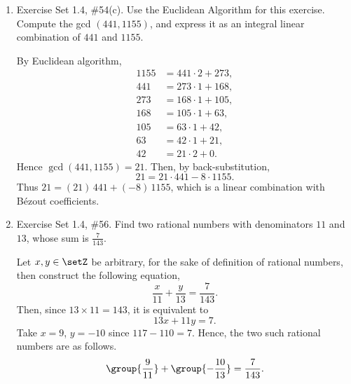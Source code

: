 \begin{enumerate}
  \item Exercise Set 1.4, \#54(c). Use the Euclidean Algorithm for this exercise. Compute the 
  gcd $(441,1155)$, and express it as an integral linear combination of $441$ and $1155$.
  \begin{subanswer}
    By Euclidean algorithm,
    \[
      \begin{aligned}
        1155 &= 441\cdot 2 + 273,\\
        441 &= 273\cdot 1 + 168,\\
        273 &= 168\cdot 1 + 105,\\
        168 &= 105\cdot 1 + 63,\\
        105 &= 63\cdot 1 + 42,\\
        63  &= 42\cdot 1 + 21,\\
        42  &= 21\cdot 2 + 0.
      \end{aligned}
    \]
    Hence $\gcd(441,1155)=21$. Then, by back-substitution,
    \[
      21 = 21\cdot 441 - 8\cdot 1155.
    \]
    Thus $21 = (21)\,441 + (-8)\,1155$, which is a linear combination with Bézout coefficients.
  \end{subanswer}


  \item Exercise Set 1.4, \#56. Find two rational numbers with denominators $11$ and $13$, whose 
  sum is $\frac{7}{143}$.
  \begin{subanswer}
    Let $x,y\in\setZ$ be arbitrary, for the sake of definition of rational numbers, then construct 
    the following equation,
    $$\dfrac{x}{11}+\dfrac{y}{13}=\dfrac{7}{143}.$$
    Then, since $13\times11=143$, it is equivalent to 
    $$13x+11y=7.$$ 
    Take $x=9$, $y=-10$ since $117-110=7$. Hence, the two such rational numbers are as follows.
    \[
      \group{\frac{9}{11}}+\group{-\frac{10}{13}}=\frac{7}{143}.
    \]
  \end{subanswer}
\end{enumerate}
